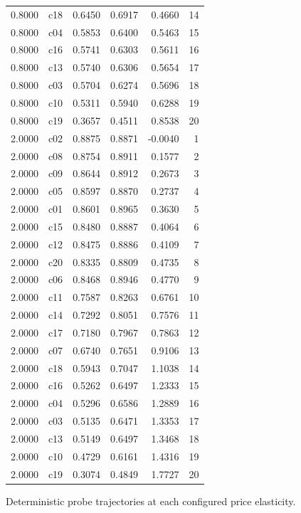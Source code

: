 \begin{table}[htbp]
\begin{tabular}{lrrrrr}
0.8000 & c18 & 0.6450 & 0.6917 & 0.4660 & 14 \\
0.8000 & c04 & 0.5853 & 0.6400 & 0.5463 & 15 \\
0.8000 & c16 & 0.5741 & 0.6303 & 0.5611 & 16 \\
0.8000 & c13 & 0.5740 & 0.6306 & 0.5654 & 17 \\
0.8000 & c03 & 0.5704 & 0.6274 & 0.5696 & 18 \\
0.8000 & c10 & 0.5311 & 0.5940 & 0.6288 & 19 \\
0.8000 & c19 & 0.3657 & 0.4511 & 0.8538 & 20 \\
2.0000 & c02 & 0.8875 & 0.8871 & -0.0040 & 1 \\
2.0000 & c08 & 0.8754 & 0.8911 & 0.1577 & 2 \\
2.0000 & c09 & 0.8644 & 0.8912 & 0.2673 & 3 \\
2.0000 & c05 & 0.8597 & 0.8870 & 0.2737 & 4 \\
2.0000 & c01 & 0.8601 & 0.8965 & 0.3630 & 5 \\
2.0000 & c15 & 0.8480 & 0.8887 & 0.4064 & 6 \\
2.0000 & c12 & 0.8475 & 0.8886 & 0.4109 & 7 \\
2.0000 & c20 & 0.8335 & 0.8809 & 0.4735 & 8 \\
2.0000 & c06 & 0.8468 & 0.8946 & 0.4770 & 9 \\
2.0000 & c11 & 0.7587 & 0.8263 & 0.6761 & 10 \\
2.0000 & c14 & 0.7292 & 0.8051 & 0.7576 & 11 \\
2.0000 & c17 & 0.7180 & 0.7967 & 0.7863 & 12 \\
2.0000 & c07 & 0.6740 & 0.7651 & 0.9106 & 13 \\
2.0000 & c18 & 0.5943 & 0.7047 & 1.1038 & 14 \\
2.0000 & c16 & 0.5262 & 0.6497 & 1.2333 & 15 \\
2.0000 & c04 & 0.5296 & 0.6586 & 1.2889 & 16 \\
2.0000 & c03 & 0.5135 & 0.6471 & 1.3353 & 17 \\
2.0000 & c13 & 0.5149 & 0.6497 & 1.3468 & 18 \\
2.0000 & c10 & 0.4729 & 0.6161 & 1.4316 & 19 \\
2.0000 & c19 & 0.3074 & 0.4849 & 1.7727 & 20 \\
\bottomrule
\end{tabular}
\par\smallskip
\begin{minipage}{\linewidth}\footnotesize Deterministic probe trajectories at each configured price elasticity.\end{minipage}
\end{table}

